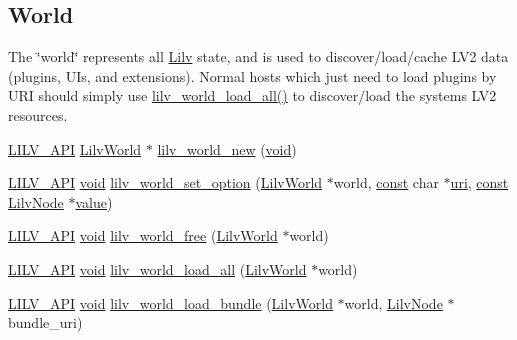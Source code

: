 \subsection*{World}
\label{_amgrpf5a7924e621e84c9280a9a27e1bcb7f6}%
The \char`\"{}world\char`\"{} represents all \hyperlink{namespace_lilv}{Lilv} state, and is used to discover/load/cache L\+V2 data (plugins, U\+Is, and extensions). Normal hosts which just need to load plugins by U\+RI should simply use \hyperlink{group__lilv_ga40509571785778228c713ee4db4b047a}{lilv\+\_\+world\+\_\+load\+\_\+all()} to discover/load the system\textquotesingle{}s L\+V2 resources. \begin{DoxyCompactItemize}
\item 
\hyperlink{lilv_8h_aa5182eee7ddff96862d0171967ee6f77}{L\+I\+L\+V\+\_\+\+A\+PI} \hyperlink{lilv_8h_a91c1745aa6ffca2b6b87c56df6c5ab86}{Lilv\+World} $\ast$ \hyperlink{group__lilv_ga645012b5e1ead2a439a319c0868cf35a}{lilv\+\_\+world\+\_\+new} (\hyperlink{sound_8c_ae35f5844602719cf66324f4de2a658b3}{void})
\item 
\hyperlink{lilv_8h_aa5182eee7ddff96862d0171967ee6f77}{L\+I\+L\+V\+\_\+\+A\+PI} \hyperlink{sound_8c_ae35f5844602719cf66324f4de2a658b3}{void} \hyperlink{group__lilv_gabd02119421852cb7fe884eea89ec4cde}{lilv\+\_\+world\+\_\+set\+\_\+option} (\hyperlink{lilv_8h_a91c1745aa6ffca2b6b87c56df6c5ab86}{Lilv\+World} $\ast$world, \hyperlink{getopt1_8c_a2c212835823e3c54a8ab6d95c652660e}{const} char $\ast$\hyperlink{lib_2expat_8h_a5a9fdd6c2606370ad12f24c078ac6585}{uri}, \hyperlink{getopt1_8c_a2c212835823e3c54a8ab6d95c652660e}{const} \hyperlink{lilv_8h_ae183dca3dca5368d34dbd863a405437b}{Lilv\+Node} $\ast$\hyperlink{lib_2expat_8h_a4a30a13b813682e68c5b689b45c65971}{value})
\item 
\hyperlink{lilv_8h_aa5182eee7ddff96862d0171967ee6f77}{L\+I\+L\+V\+\_\+\+A\+PI} \hyperlink{sound_8c_ae35f5844602719cf66324f4de2a658b3}{void} \hyperlink{group__lilv_gad60eddb41936cb2461fb3448dfdea083}{lilv\+\_\+world\+\_\+free} (\hyperlink{lilv_8h_a91c1745aa6ffca2b6b87c56df6c5ab86}{Lilv\+World} $\ast$world)
\item 
\hyperlink{lilv_8h_aa5182eee7ddff96862d0171967ee6f77}{L\+I\+L\+V\+\_\+\+A\+PI} \hyperlink{sound_8c_ae35f5844602719cf66324f4de2a658b3}{void} \hyperlink{group__lilv_ga40509571785778228c713ee4db4b047a}{lilv\+\_\+world\+\_\+load\+\_\+all} (\hyperlink{lilv_8h_a91c1745aa6ffca2b6b87c56df6c5ab86}{Lilv\+World} $\ast$world)
\item 
\hyperlink{lilv_8h_aa5182eee7ddff96862d0171967ee6f77}{L\+I\+L\+V\+\_\+\+A\+PI} \hyperlink{sound_8c_ae35f5844602719cf66324f4de2a658b3}{void} \hyperlink{group__lilv_ga6ebdd115ffd557c8100d8244c8f6c4de}{lilv\+\_\+world\+\_\+load\+\_\+bundle} (\hyperlink{lilv_8h_a91c1745aa6ffca2b6b87c56df6c5ab86}{Lilv\+World} $\ast$world, \hyperlink{lilv_8h_ae183dca3dca5368d34dbd863a405437b}{Lilv\+Node} $\ast$bundle\+\_\+uri)

\end{DoxyCompactItemize}
